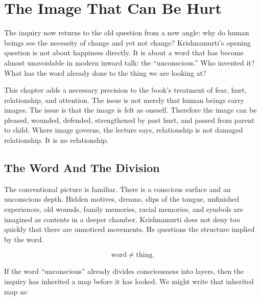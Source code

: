 \documentclass[11pt,oneside]{book}
\begin{document}

\chapter{The Image That Can Be Hurt}

The inquiry now returns to the old question from a new angle: why do human beings see the necessity of change and yet not change? Krishnamurti's opening question is not about happiness directly. It is about a word that has become almost unavoidable in modern inward talk: the ``unconscious.'' Who invented it? What has the word already done to the thing we are looking at?

This chapter adds a necessary precision to the book's treatment of fear, hurt, relationship, and attention. The issue is not merely that human beings carry images. The issue is that the image is felt as oneself. Therefore the image can be pleased, wounded, defended, strengthened by past hurt, and passed from parent to child. Where image governs, the lecture says, relationship is not damaged relationship. It is no relationship.

\section{The Word And The Division}

The conventional picture is familiar. There is a conscious surface and an unconscious depth. Hidden motives, dreams, slips of the tongue, unfinished experiences, old wounds, family memories, racial memories, and symbols are imagined as contents in a deeper chamber. Krishnamurti does not deny too quickly that there are unnoticed movements. He questions the structure implied by the word.

\begin{equation}
\text{word} \neq \text{thing}.
\end{equation}

If the word ``unconscious'' already divides consciousness into layers, then the inquiry has inherited a map before it has looked. We might write that inherited map as:
\end{document}
